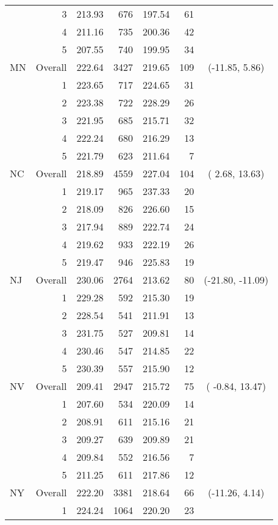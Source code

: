 \begin{longtable}{lrrr@{\extracolsep{.25cm}}rrc}
   & 3 & 213.93 & 676 & 197.54 &  61 &  \\ 
   & 4 & 211.16 & 735 & 200.36 &  42 &  \\ 
   & 5 & 207.55 & 740 & 199.95 &  34 &  \\ 
   \hline
MN & Overall & 222.64 & 3427 & 219.65 & 109 & (-11.85,   5.86) \\ 
   & 1 & 223.65 & 717 & 224.65 &  31 &  \\ 
   & 2 & 223.38 & 722 & 228.29 &  26 &  \\ 
   & 3 & 221.95 & 685 & 215.71 &  32 &  \\ 
   & 4 & 222.24 & 680 & 216.29 &  13 &  \\ 
   & 5 & 221.79 & 623 & 211.64 &   7 &  \\ 
   \hline
NC & Overall & 218.89 & 4559 & 227.04 & 104 & (  2.68,  13.63) \\ 
   & 1 & 219.17 & 965 & 237.33 &  20 &  \\ 
   & 2 & 218.09 & 826 & 226.60 &  15 &  \\ 
   & 3 & 217.94 & 889 & 222.74 &  24 &  \\ 
   & 4 & 219.62 & 933 & 222.19 &  26 &  \\ 
   & 5 & 219.47 & 946 & 225.83 &  19 &  \\ 
   \hline
NJ & Overall & 230.06 & 2764 & 213.62 &  80 & (-21.80, -11.09) \\ 
   & 1 & 229.28 & 592 & 215.30 &  19 &  \\ 
   & 2 & 228.54 & 541 & 211.91 &  13 &  \\ 
   & 3 & 231.75 & 527 & 209.81 &  14 &  \\ 
   & 4 & 230.46 & 547 & 214.85 &  22 &  \\ 
   & 5 & 230.39 & 557 & 215.90 &  12 &  \\ 
   \hline
NV & Overall & 209.41 & 2947 & 215.72 &  75 & ( -0.84,  13.47) \\ 
   & 1 & 207.60 & 534 & 220.09 &  14 &  \\ 
   & 2 & 208.91 & 611 & 215.16 &  21 &  \\ 
   & 3 & 209.27 & 639 & 209.89 &  21 &  \\ 
   & 4 & 209.84 & 552 & 216.56 &   7 &  \\ 
   & 5 & 211.25 & 611 & 217.86 &  12 &  \\ 
   \hline
NY & Overall & 222.20 & 3381 & 218.64 &  66 & (-11.26,   4.14) \\ 
   & 1 & 224.24 & 1064 & 220.20 &  23 &  \\ 

\end{longtable}
